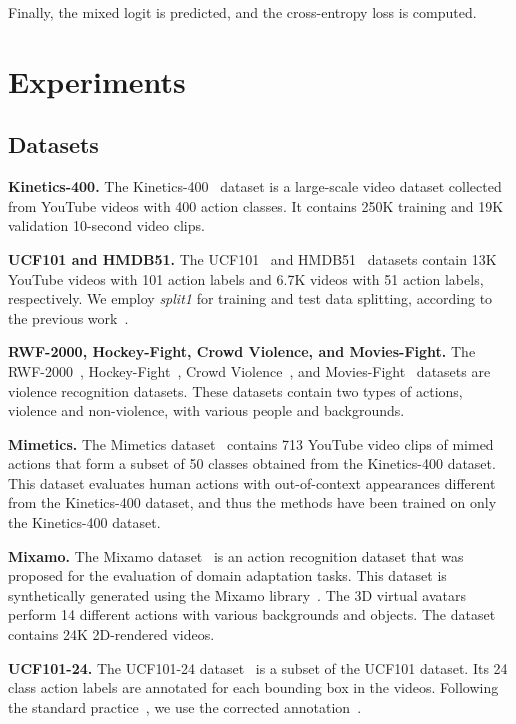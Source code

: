 \documentclass[10pt,twocolumn,letterpaper]{article}
\begin{document}
Finally, the mixed logit  is predicted, and the cross-entropy loss  is computed.


\section{Experiments}

\subsection{Datasets}

\noindent \textbf{Kinetics-400.} 
The Kinetics-400~\cite{Carreira2017CVPR} dataset is a large-scale video dataset collected from YouTube videos with 400 action classes.
It contains 250K training and 19K validation 10-second video clips.

\noindent \textbf{UCF101 and HMDB51.} 
The UCF101~\cite{Soomro2012Arxiv} and HMDB51~\cite{Kuehne2011ICCV} datasets contain 13K YouTube videos with 101 action labels and 6.7K videos with 51 action labels, respectively.
We employ \textit{split1} for training and test data splitting, according to the previous work~\cite{Duan2022CVPR}.


\noindent \textbf{RWF-2000, Hockey-Fight, Crowd Violence, and Movies-Fight.} 
The RWF-2000~\cite{Cheng2021ICPR}, Hockey-Fight~\cite{CAIP2011Nievas}, Crowd Violence~\cite{CVPR2012Hassner}, and Movies-Fight~\cite{nievas2011violence} datasets are violence recognition datasets.
These datasets contain two types of actions, violence and non-violence, with various people and backgrounds.


\noindent \textbf{Mimetics.} 
The Mimetics dataset~\cite{Weinzaepfel2021IJCV} contains 713 YouTube video clips of mimed actions that form a subset of 50 classes obtained from the Kinetics-400 dataset.
This dataset evaluates human actions with out-of-context appearances different from the Kinetics-400 dataset, and thus the methods have been trained on only the Kinetics-400 dataset.

\noindent \textbf{Mixamo.} 
The Mixamo dataset~\cite{Costa2022WACV} is an action recognition dataset that was proposed for the evaluation of domain adaptation tasks.
This dataset is synthetically generated using the Mixamo library~\cite{mixamo}.
The 3D virtual avatars perform 14 different actions with various backgrounds and objects.
The dataset contains 24K 2D-rendered videos.

\noindent \textbf{UCF101-24.} 
The UCF101-24 dataset~\cite{Soomro2012Arxiv} is a subset of the UCF101 dataset.
Its 24 class action labels are annotated for each bounding box in the videos.
Following the standard practice~\cite{Cheron2018Neurips,Anurag2020ECCV}, we use the corrected annotation~\cite{Singh2017ICCV}.
\end{document}
